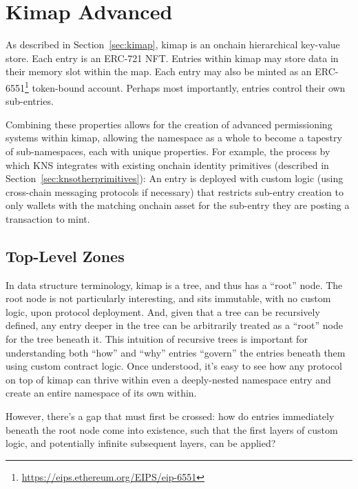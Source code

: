 \documentclass[runningheads]{llncs}
\begin{document}
\section{Kimap Advanced}
\label{sec:kimapadvanced}

As described in Section~\ref{sec:kimap}, kimap is an onchain hierarchical key-value store.
Each entry is an ERC-721 NFT.
Entries within kimap may store data in their memory slot within the map.
Each entry may also be minted as an ERC-6551\footnote{\url{https://eips.ethereum.org/EIPS/eip-6551}} token-bound account.
Perhaps most importantly, entries control their own sub-entries.

Combining these properties allows for the creation of advanced permissioning systems within kimap, allowing the namespace as a whole to become a tapestry of sub-namespaces, each with unique properties.
For example, the process by which KNS integrates with existing onchain identity primitives (described in Section~\ref{sec:knsotherprimitives}):
An entry is deployed with custom logic (using cross-chain messaging protocols if necessary) that restricts sub-entry creation to only wallets with the matching onchain asset for the sub-entry they are posting a transaction to mint.

\subsection{Top-Level Zones}
\label{sec:tlz}

In data structure terminology, kimap is a tree, and thus has a ``root'' node.
The root node is not particularly interesting, and sits immutable, with no custom logic, upon protocol deployment.
And, given that a tree can be recursively defined, any entry deeper in the tree can be arbitrarily treated as a ``root'' node for the tree beneath it.
This intuition of recursive trees is important for understanding both ``how'' and ``why'' entries ``govern'' the entries beneath them using custom contract logic.
Once understood, it's easy to see how any protocol on top of kimap can thrive within even a deeply-nested namespace entry and create an entire namespace of its own within.

However, there's a gap that must first be crossed: how do entries immediately beneath the root node come into existence, such that the first layers of custom logic, and potentially infinite subsequent layers, can be applied?
\end{document}
